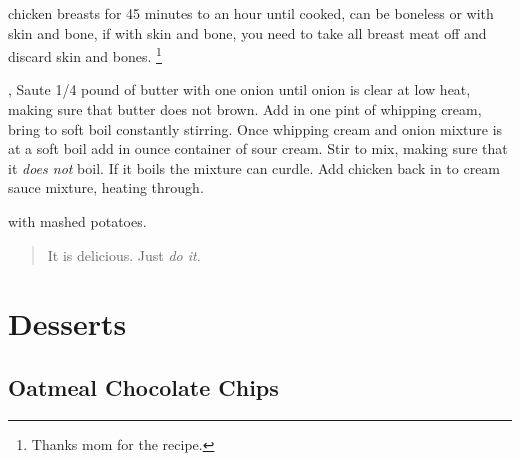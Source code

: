 \documentclass{tufte-book}
\begin{document}

 chicken breasts for 45 minutes to an hour until cooked,
can be boneless or with skin and bone, if with skin and bone, you need to take
all breast meat off and discard skin and bones.  \footnote{Thanks mom for the
recipe.}

, Saute 1/4 pound of butter with one onion until onion
is clear at low heat, making sure that butter does not brown.  Add in one pint
of whipping cream, bring to soft boil constantly stirring. Once whipping cream
and onion mixture is at a soft boil add in  ounce container of sour cream.  Stir to mix, making sure that it \emph{does not} boil. If it boils the mixture can curdle.  Add chicken back in to cream sauce mixture, heating through.

 with mashed potatoes.


\begin{quote}
It is delicious. Just \emph{do it}.
\end{quote}


\chapter{Desserts}

\section{Oatmeal Chocolate Chips}
\end{document}
